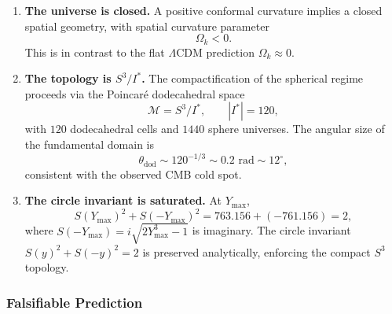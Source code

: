 \documentclass[a4paper,1pt,oneside,openany]{book}
\begin{document}
\begin{enumerate}
\item \textbf{The universe is closed.} A positive conformal curvature implies a closed spatial geometry, with spatial curvature parameter
\begin{equation}
\Omega_k < 0.
\label{eq:Omega-k}
\end{equation}
This is in contrast to the flat $\Lambda$CDM prediction $\Omega_k \approx 0$.

\item \textbf{The topology is $S^3/I^*$.} The compactification of the spherical regime proceeds via the Poincaré dodecahedral space
\begin{equation}
\mathcal{M} = S^3 / I^*, \qquad |I^*| = 120,
\label{eq:poincare}
\end{equation}
with $120$ dodecahedral cells and $1440$ sphere universes. The angular size of the fundamental domain is
\begin{equation}
\theta_{\mathrm{dod}} \sim 120^{-1/3} \sim 0.2 \text{ rad} \sim 12^\circ,
\label{eq:theta-dod}
\end{equation}
consistent with the observed CMB cold spot.

\item \textbf{The circle invariant is saturated.} At $Y_{\max}$,
\begin{equation}
S(Y_{\max})^2 + S(-Y_{\max})^2 = 763.156 + (-761.156) = 2,
\label{eq:circle-saturated}
\end{equation}
where $S(-Y_{\max}) = i\sqrt{2Y_{\max}^3 - 1}$ is imaginary. The circle invariant $S(y)^2 + S(-y)^2 = 2$ is preserved analytically, enforcing the compact $S^3$ topology.
\end{enumerate}

\subsubsection{Falsifiable Prediction}
\end{document}
